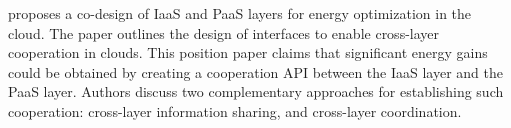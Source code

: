\cite{carpen-amarie_towards_2014} proposes a co-design of IaaS and PaaS layers for energy optimization in the cloud. The paper outlines the design of interfaces to enable cross-layer cooperation in clouds. This position paper claims that significant energy gains could be obtained by creating a cooperation API between the IaaS layer and the PaaS layer. Authors discuss two complementary approaches for establishing such cooperation: cross-layer information sharing, and cross-layer coordination.







